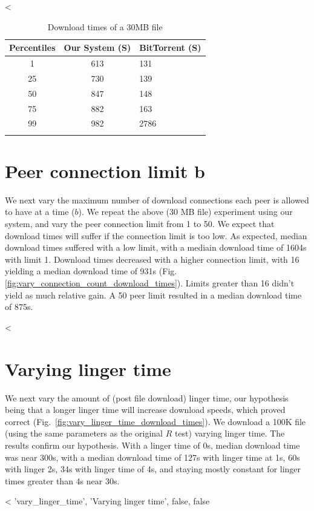 <%

\begin{table}
  \caption{Download times of a 30MB file}
\begin{tabular}{ c c l }
  Percentiles & Our System (S) & BitTorrent (S) \\
  \hline
  1 & 613 & 131 \\
  25 & 730 & 139 \\
  50 & 847 & 148 \\
  75 & 882 & 163 \\
  99 & 982 & 2786 \\
  \label{fig:yanc_vs_bt}
\end{tabular}
\end{table}
  
\section{Peer connection limit b} 

We next vary the maximum number of download connections each peer is allowed to have at a time ($b$). We 
repeat the above (30 MB file) experiment using our system, and vary the peer connection limit from 1 to 50. 
We expect that download times will suffer if the connection limit is too low. As expected, median 
download times suffered with a low limit, with a mediain download time of 1604s with limit 1. Download 
times decreased with a higher connection limit, with 16 yielding a median download time of 931s 
(Fig. \ref{fig:vary_connection_count_download_times}).  Limits greater than 16 didn't 
yield as much relative gain. A 50 peer limit resulted in a median download time of 875s.

<%

\section{Varying linger time}

We next vary the amount of (post file download) linger time, our hypothesis being that a longer linger 
time will increase download speeds, which proved correct (Fig.~\ref{fig:vary_linger_time_download_times}). 
We download a 100K file (using the same parameters as the original $R$ test) varying linger time. The 
results confirm our hypothesis. With a linger time of 0s, median download time was near 300s, with 
a median download time of 127s with linger time at 1s, 60s with linger 2s, 34s with linger time of 4s, 
and staying mostly constant for linger times greater than 4s near 30s.

<%
 'vary_linger_time', 'Varying linger time', false, false %
